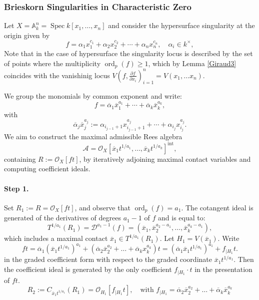 \documentclass{amsart}
\renewcommand{\cD}{{\mathcal D}}
\newcommand{\Spec}{\operatorname{Spec}}
\newcommand{\ord}{{\operatorname{ord}}}
\begin{document}
\subsubsection{Brieskorn Singularities in Characteristic Zero} \label{11}
\begin{example}
Let \( X = \mathbb{A}^n_k = \Spec k[x_1, \ldots, x_n] \) and consider the hypersurface singularity at the origin given by
\[
f = \alpha_1 x_1^{c_1} + \alpha_2 x_2^{c_2} + \cdots + \alpha_n x_n^{c_n}, \quad \alpha_i \in k^\times,
\]
Note that in the case of hypersurface the singularity locus is described by the set of points where the multiplicity $\ord_p(f)\geq 1$, which by Lemma \ref{Giraud3} coincides with the vanishinig locus $V(f, \frac{\partial{f}}{\partial{x}_i})_{i=1}^n=V(x_1,\ldots x_n)$.

We group the monomials by common exponent and write:
\[
f = \overline{\alpha}_1\overline{x}_1^{a_1} + \cdots + \overline{\alpha}_k\overline{x}_k^{a_k},
\]
with
\[
\overline{\alpha}_j \overline{x}_j^{a_j} := \alpha_{i_{j-1}+1}x_{i_{j-1}+1}^{a_j} + \cdots + \alpha_{i_j}x_{i_j}^{a_j}.
\]
We aim to construct the maximal admissible Rees algebra
\[
\mathcal{A} = \mathcal{O}_X[\overline{x}_1 t^{1/a_1}, \ldots, \overline{x}_k t^{1/a_k}]^{\mathrm{int}},
\]
containing \( R := \mathcal{O}_X[f t] \), by iteratively adjoining maximal contact variables and computing coefficient ideals.

\paragraph{\bf Step 1.} Set \( R_1 := R= \mathcal{O}_X[f t]  \), and observe that \( \ord_p(f) = a_1 \). The cotangent ideal is generated of the derivatives of degrees $a_1-1$ of $f$  and is equal to: 
\[
T^{1/a_1}(R_1) = \cD^{a_1-1}(f) = (\overline{x}_1, \overline{x}_2^{a_2 - a_1}, \ldots, \overline{x}_k^{a_k - a_1}),
\]
which includes a maximal contact \( \overline{x}_1\in T^{1/a_1}(R_1) \). Let \( H_1 = V(\overline{x}_1) \).  Write 
$$ft=\overline{\alpha}_1(\overline{x}_1t^{1/a_1})^{a_1}+(\overline{\alpha}_2\overline{x}_2^{a_2}+\ldots +\overline{\alpha}_k x_k^{a_k})t=(\overline{\alpha}_1\overline{x}_1t^{1/a_1})^{a_1}+f_{|H_1} t.$$ in the graded coefficient form with respect to
 the graded  coordinate  $\overline{x}_1t^{1/a_1}$. 
Then the  coefficient ideal  is generated by  the only coefficient $f_{|H_1} \cdot t $ in the presentation of $f  t$.
\[
R_2 := C_{\overline{x}_1 t^{1/a_1}}(R_1) = \mathcal{O}_{H_1}[ f_{|H_1} t],\quad \text{with } f_{|H_1} = \overline{\alpha}_2\overline{x}_2^{{a}_2}+\ldots +\overline{\alpha}_k\overline{x}_k^{{a}_k}
\]


\end{example}
\end{document}
